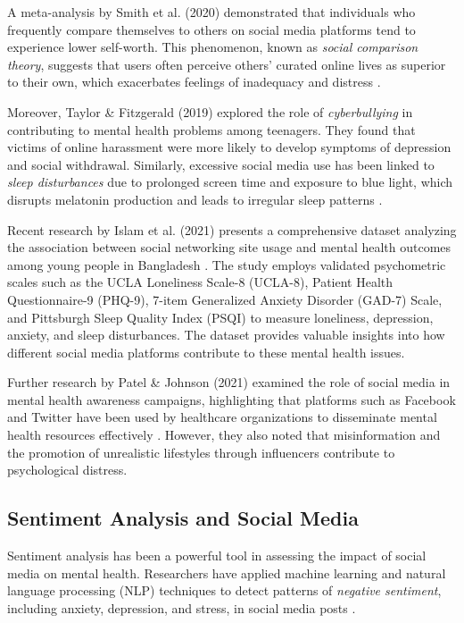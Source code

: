\documentclass[twocolumn,numbers]{article}
\begin{document}
A meta-analysis by Smith et al. (2020) demonstrated that individuals who frequently compare themselves to others on social media platforms tend to experience lower self-worth. This phenomenon, known as \textit{social comparison theory}, suggests that users often perceive others' curated online lives as superior to their own, which exacerbates feelings of inadequacy and distress \citep{jones2020}. 

Moreover, Taylor \& Fitzgerald (2019) explored the role of \textit{cyberbullying} in contributing to mental health problems among teenagers. They found that victims of online harassment were more likely to develop symptoms of depression and social withdrawal. Similarly, excessive social media use has been linked to \textit{sleep disturbances} due to prolonged screen time and exposure to blue light, which disrupts melatonin production and leads to irregular sleep patterns \citep{johnson2020}.

Recent research by Islam et al. (2021) presents a comprehensive dataset analyzing the association between social networking site usage and mental health outcomes among young people in Bangladesh \citep{islam2021}. The study employs validated psychometric scales such as the UCLA Loneliness Scale-8 (UCLA-8), Patient Health Questionnaire-9 (PHQ-9), 7-item Generalized Anxiety Disorder (GAD-7) Scale, and Pittsburgh Sleep Quality Index (PSQI) to measure loneliness, depression, anxiety, and sleep disturbances. The dataset provides valuable insights into how different social media platforms contribute to these mental health issues.

Further research by Patel \& Johnson (2021) examined the role of social media in mental health awareness campaigns, highlighting that platforms such as Facebook and Twitter have been used by healthcare organizations to disseminate mental health resources effectively \citep{patel2021}. However, they also noted that misinformation and the promotion of unrealistic lifestyles through influencers contribute to psychological distress.

\subsection{Sentiment Analysis and Social Media}
Sentiment analysis has been a powerful tool in assessing the impact of social media on mental health. Researchers have applied machine learning and natural language processing (NLP) techniques to detect patterns of \textit{negative sentiment}, including anxiety, depression, and stress, in social media posts \citep{lee2020}. 
\end{document}
